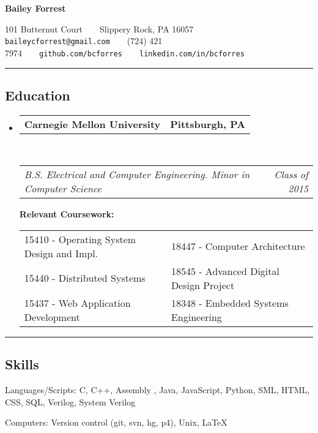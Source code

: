 \documentclass[10pt, letterpaper]{article}
\makeatletter
\newcommand{\titleTopOffset}{-1.0em} %
\newcommand{\titleBotOffset}{-0.4em} %
\newenvironment{indentsection}[1]%
{\begin{list}{}
    {\setlength{\leftmargin}{#1}}
    \item[]
}
{\end{list}}
\newcommand{\headerrow}[2]
{\begin{tabular*}{\linewidth}{l@{\extracolsep{\fill}}r}
    #1 & #2 \\
\end{tabular*}}
\newcommand{\sectionheader}[1]
{\hrule
\vspace{\titleTopOffset}
\subsection*{#1}
\vspace{\titleBotOffset}}
\makeatother
\begin{document}
\begin{center}
{\LARGE \textbf{Bailey Forrest}}

101 Butternut Court\ \ \textbullet \ \ Slippery Rock, PA 16057 \\
\texttt{baileycforrest@gmail.com}\ \ \textbullet \ \ (724) 421 7974\ \ \textbullet \ \ \texttt{github.com/bcforres}\ \ \textbullet \ \ \texttt{linkedin.com/in/bcforres}
\end{center}

\sectionheader{Education}
\begin{itemize}
    \item
        \headerrow
            {\textbf{Carnegie Mellon University}}
            {\textbf{Pittsburgh, PA}}
        \\
        \headerrow
            {\emph{B.S. Electrical and Computer Engineering. Minor in Computer Science}}
            {\emph{Class of 2015}}


        \smallskip
        \textbf{Relevant Coursework:}

        \begin{tabular*}{\linewidth}{p{0.5\linewidth}  p{0.5\linewidth}}
            15410 - Operating System Design and Impl. & 18447 - Computer Architecture \\
            15440 - Distributed Systems & 18545 - Advanced Digital Design Project \\
            15437 - Web Application Development & 18348 - Embedded Systems Engineering \\
        \end{tabular*}
\end{itemize}


\sectionheader{Skills}
\begin{indentsection}{\parindent}
    \begin{description*}
        \item[Languages/Scripts:]
            C, C++, Assembly , Java, JavaScript, Python, SML, HTML, CSS, SQL,
            Verilog, System Verilog

        \item[Computers:]
            Version control (git, svn, hg, p4), Unix, \LaTeX
    \end{description*}
\end{indentsection}
\end{document}
